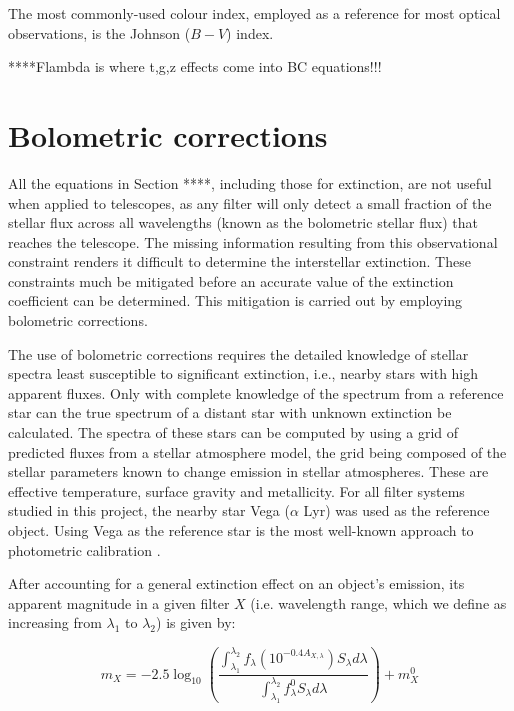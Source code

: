 \documentclass[12pt, a4paper]{report}
\begin{document}
The most commonly-used colour index, employed as a reference for most optical observations, is the Johnson ($B-V$) index.

****Flambda is where t,g,z effects come into BC equations!!!

\section{Bolometric corrections} \label{BC_theory}
All the equations in Section ****, including those for extinction, are not useful when applied to telescopes, as any filter will only detect a small fraction of the stellar flux across all wavelengths (known as the bolometric stellar flux) that reaches the telescope. The missing information resulting from this observational constraint renders it difficult to determine the interstellar extinction. These constraints much be mitigated before an accurate value of the extinction coefficient can be determined. This mitigation is carried out by employing bolometric corrections.

The use of bolometric corrections requires the detailed knowledge of stellar spectra least susceptible to significant extinction, i.e., nearby stars with high apparent fluxes. Only with complete knowledge of the spectrum from a reference star can the true spectrum of a distant star with unknown extinction be calculated. The spectra of these stars can be computed by using a grid of predicted fluxes from a stellar atmosphere model, the grid being composed of the stellar parameters known to change emission in stellar atmospheres. These are effective temperature, surface gravity and metallicity. For all filter systems studied in this project, the nearby star Vega ($\alpha$ Lyr) was used as the reference object. Using Vega as the reference star is the most well-known approach to photometric calibration \citep{2014MNRAS.444..392C}.

After accounting for a general extinction effect on an object's emission, its apparent magnitude in a given filter $X$ (i.e. wavelength range, which we define as increasing from $\lambda _{1}$ to $\lambda _{2}$) is given by:

\begin{equation}
m_{X} = -2.5 \log_{10} \left(\frac{ \int_{\lambda_{1}}^{\lambda_{2}} f_{\lambda} \left( 10^{-0.4 A_{X,\lambda}} \right) S_{\lambda} d\lambda }{ \int_{\lambda_{1}}^{\lambda_{2}} f_{\lambda}^{0} S_{\lambda} d\lambda }\right) + m_{X}^{0}
\label{app_mag_def}
\end{equation}
\end{document}
